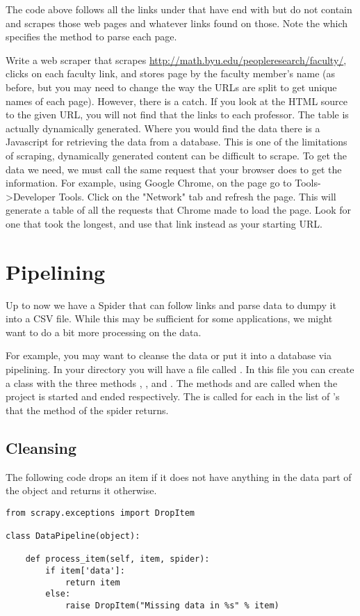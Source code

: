 The code above follows all the links under  that have end with  but do not contain  and scrapes those web pages and whatever links found on those.
Note the  which specifies the  method to parse each page.


\begin{problem}
Write a web scraper that scrapes \url{http://math.byu.edu/peopleresearch/faculty/}, clicks on each faculty link, and stores page by the faculty member's name (as before, but you may need to change the way the URLs are split to get unique names of each page). 
However, there is a catch. 
If you look at the HTML source to the given URL, you will not find that the links to each professor. 
The table is actually dynamically generated. 
Where you would find the data there is a Javascript for retrieving the data from a database.
This is one of the limitations of scraping, dynamically generated content can be difficult to scrape. 
To get the data we need, we must call the same request that your browser does to get the information. 
For example, using Google Chrome, on the page go to Tools->Developer Tools. Click on the "Network" tab and refresh the page. 
This will generate a table of all the requests that Chrome made to load the page. 
Look for one that took the longest, and use that link instead as your starting URL.
\end{problem}

\section*{Pipelining}
Up to now we have a Spider that can follow links and parse data to dumpy it into a CSV file. 
While this may be sufficient for some applications, we might want to do a bit more processing on the data.

For example, you may want to cleanse the data or put it into a database via pipelining. 
In your directory  you will have a file called . 
In this file you can create a class with the three methods , , and . The methods  and  are called when the project is started and ended respectively.
The  is called for each  in the list of 's that the  method of the spider returns.

\subsection*{Cleansing}
The following code drops an item if it does not have anything in the data part of the object and returns it otherwise.
\begin{lstlisting}
from scrapy.exceptions import DropItem

class DataPipeline(object):

    def process_item(self, item, spider):
        if item['data']:
            return item
        else:
            raise DropItem("Missing data in %s" % item)
\end{lstlisting}


